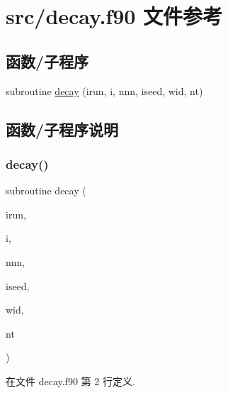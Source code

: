 \hypertarget{decay_8f90}{}\section{src/decay.f90 文件参考}
\label{decay_8f90}
\subsection*{函数/子程序}
\begin{DoxyCompactItemize}
\item 
subroutine \mbox{\hyperlink{decay_8f90_a0896781f5be84b7c8acc43844e8b1a1b}{decay}} (irun, i, nnn, iseed, wid, nt)
\end{DoxyCompactItemize}


\subsection{函数/子程序说明}
\mbox{\label{decay_8f90_a0896781f5be84b7c8acc43844e8b1a1b}} 
\subsubsection{\texorpdfstring{decay()}{decay()}}
{\footnotesize\ttfamily subroutine decay (\begin{DoxyParamCaption}\item[{}]{irun,  }\item[{}]{i,  }\item[{}]{nnn,  }\item[{}]{iseed,  }\item[{}]{wid,  }\item[{}]{nt }\end{DoxyParamCaption})}



在文件 decay.\+f90 第 2 行定义.

